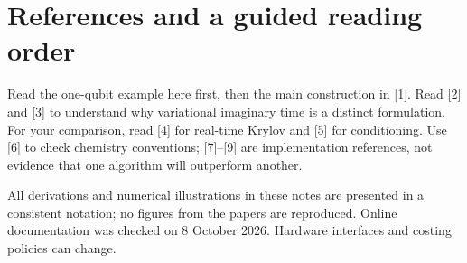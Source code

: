 \documentclass[11pt,a4paper]{article}
\begin{document}
\clearpage
\section*{References and a guided reading order}
Read the one-qubit example here first, then the main construction in [1]. Read [2] and [3] to understand why variational imaginary time is a distinct formulation. For your comparison, read [4] for real-time Krylov and [5] for conditioning. Use [6] to check chemistry conventions; [7]--[9] are implementation references, not evidence that one algorithm will outperform another.

All derivations and numerical illustrations in these notes are presented in a consistent notation; no figures from the papers are reproduced. Online documentation was checked on 8 October 2026. Hardware interfaces and costing policies can change.
\end{document}
